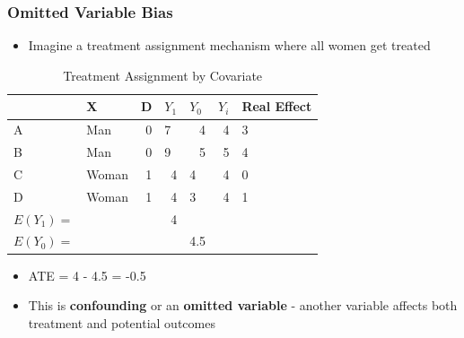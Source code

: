 \documentclass[xcolor=x11names,compress]{beamer}\usepackage[]{graphicx}\usepackage[]{color}
\renewcommand{\(}{\begin{columns}}
\renewcommand{\)}{\end{columns}}
\newcommand{\<}[1]{\begin{column}{#1}}
\renewcommand{\>}{\end{column}}
\begin{document}
\begin{frame}
\frametitle{Omitted Variable Bias}
\begin{itemize}
\item Imagine a treatment assignment mechanism where all women get treated
\end{itemize}
\begin{table}[htbp]
  \centering
  \caption{Treatment Assignment by Covariate}
    \begin{tabular}{|l|l|r|r|l|r|l|}
    \hline
          & X     & \multicolumn{1}{l|}{D} & \multicolumn{1}{l|}{$Y_1$} & $Y_0$  & \multicolumn{1}{l|}{$Y_i$} & Real Effect \bigstrut\\
    \hline
    A     & Man   & 0     & \multicolumn{1}{l|}{7} & \multicolumn{1}{r|}{\cellcolor{teal}4} & 4     & 3 \bigstrut\\
    \hline
    B     & Man   & 0     & \multicolumn{1}{l|}{9} & \multicolumn{1}{r|}{\cellcolor{teal}5} & 5     & 4 \bigstrut\\
    \hline
    C     & Woman & 1     & \cellcolor{teal}4     & 4     & 4     & 0 \bigstrut\\
    \hline
    D     & Woman & 1     & \cellcolor{teal}4     & 3     & 4     & 1 \bigstrut\\
    \hline\pause
    $E(Y_1)=$ & & & 4 & & \bigstrut\\
    \hline
    $E(Y_0)=$ & &  & & 4.5 & \bigstrut\\
    \hline
    \end{tabular}%
  \label{tab:addlabel}%
\end{table}%
\begin{itemize}
\pause
\item ATE = 4 - 4.5 = -0.5
\item This is \textbf{confounding} or an \textbf{omitted variable} - another variable affects both treatment and potential outcomes
\end{itemize}
\end{frame}
\end{document}
